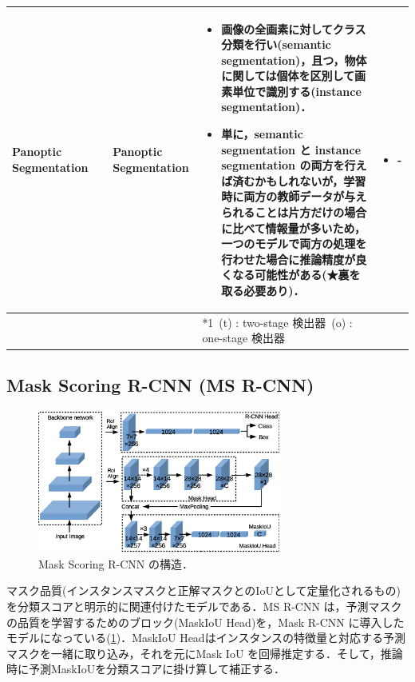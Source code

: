 \documentclass[originalpaper,fleqn]{jsaiart}     %
\begin{document}
\begin{table}
\begin{center}
\begin{tabularx}{\linewidth}{Xp{1.5cm}Xp{7cm}X}
            Panoptic Segmentation & \cite{KHGRD19} & Panoptic Segmentation & 
            \begin{itemize}
                \vspace{-0.7\baselineskip}
                \setlength{\leftskip}{-3mm}
                \item 画像の全画素に対してクラス分類を行い(semantic segmentation)，且つ，物体に関しては個体を区別して画素単位で識別する(instance segmentation)．
                \item 単に，semantic segmentation と instance segmentation の両方を行えば済むかもしれないが，学習時に両方の教師データが与えられることは片方だけの場合に比べて情報量が多いため，一つのモデルで両方の処理を行わせた場合に推論精度が良くなる可能性がある(★裏を取る必要あり)．
            \end{itemize}
            &
            \begin{itemize}
                \vspace{-0.7\baselineskip}
                \setlength{\leftskip}{-3mm}
                \item -
            \end{itemize}
            \\
            \bottomrule
            &  &  & *1\ (t) : two-stage 検出器\quad *2\ (o) : one-stage 検出器 &  \\
        \end{tabularx}
    \end{center}
\end{table}%

\subsection{Mask Scoring R-CNN (MS R-CNN)}
\begin{figure}[tb]
    \begin{center}
        \includegraphics[width=8cm,clip]{fig/archi_ms_rcnn.eps}
    \end{center}
    \caption{ Mask Scoring R-CNN の構造．}
    \label{fig:archi_ms_rcnn}
\end{figure}
マスク品質(インスタンスマスクと正解マスクとのIoUとして定量化されるもの)を分類スコアと明示的に関連付けたモデルである\cite{HHGHW19}．MS R-CNN は，予測マスクの品質を学習するためのブロック(MaskIoU Head)を，Mask R-CNN\cite{HGDG17} に導入したモデルになっている(\ref{fig:archi_ms_rcnn})．MaskIoU Headはインスタンスの特徴量と対応する予測マスクを一緒に取り込み，それを元にMask IoU を回帰推定する．そして，推論時に予測MaskIoUを分類スコアに掛け算して補正する．
\end{document}
